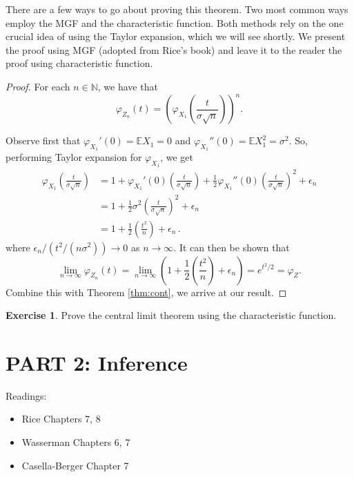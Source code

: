 \documentclass[
  openany]{book}
\providecommand{\tightlist}{%
  \setlength{\itemsep}{0pt}\setlength{\parskip}{0pt}}
\theoremstyle{definition}
\theoremstyle{definition}
\theoremstyle{definition}
\newtheorem{exercise}{Exercise}[chapter]
\theoremstyle{definition}
\theoremstyle{remark}
\begin{document}
There are a few ways to go about proving this theorem.
Two most common ways employ the MGF and the characteristic function.
Both methods rely on the one crucial idea of using the Taylor expansion,
which we will see shortly.
We present the proof using MGF (adopted from Rice's book) and leave it to the reader the proof using characteristic function.

\begin{proof}
For each \(n \in \mathbb{N}\), we have that
\[ \varphi_{Z_n} (t) = \left( \varphi_{X_1} \left( \frac{t}{\sigma \sqrt{n}} \right) \right)^n. \]

Observe first that
\(\varphi_{X_1}'(0) = \mathbb{E}X_1 = 0\) and \(\varphi_{X_1}''(0) = \mathbb{E}X_1^2 = \sigma^2\).
So, performing Taylor expansion for \(\varphi_{X_1}\), we get
\[
\begin{aligned}
\varphi_{X_1} \left( \frac{t}{\sigma \sqrt{n}} \right)  
        &=  1 + \varphi_{X_1}'(0) \left( \frac{t}{\sigma \sqrt{n}} \right) 
           + \frac{1}{2} \varphi_{X_1}''(0) \left( \frac{t}{\sigma \sqrt{n}} \right)^2 + \epsilon_n  \\
        & = 1 + \frac{1}{2} \sigma^2 \left( \frac{t}{\sigma \sqrt{n}} \right)^2 + \epsilon_n \\
        & = 1 + \frac{1}{2} \left( \frac{t^2}{n} \right) + \epsilon_n \,.
\end{aligned}\]
where \(\epsilon_n / (t^2 / (n\sigma^2)) \to 0\) as \(n \to \infty\).
It can then be shown that
\[ \lim_{n\to \infty} \varphi_{Z_n}(t) = \lim_{n\to \infty} \left( 1 + \frac{1}{2} \left( \frac{t^2}{n} \right) + \epsilon_n  \right) = e^{t^2/2} = \varphi_Z .\]
Combine this with Theorem \ref{thm:cont}, we arrive at our result.
\end{proof}

\begin{exercise}
Prove the central limit theorem using the characteristic function.
\end{exercise}

\hypertarget{part-2-inference}{%
\chapter*{PART 2: Inference}\label{part-2-inference}}


Readings:

\begin{itemize}
\tightlist
\item
  Rice Chapters 7, 8
\item
  Wasserman Chapters 6, 7
\item
  Casella-Berger Chapter 7
\end{itemize}
\end{document}
